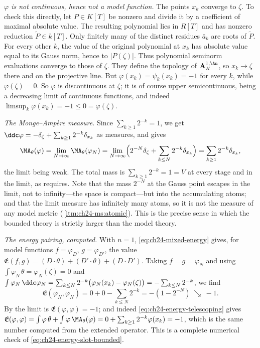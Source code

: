\begin{example}
\emph{$\varphi$ is not continuous, hence not a model function.}  The
points $x_k$ converge to $\zeta$.  To check this directly, let
$P\in K[T]$ be nonzero and divide it by a coefficient of maximal absolute
value.  The resulting polynomial lies in $R[T]$ and has nonzero reduction
$\widetilde P\in k[T]$.  Only finitely many of the distinct residues
$\bar a_k$ are roots of $\widetilde P$.  For every other $k$, the value
of the original polynomial at $x_k$ has absolute value equal to its Gauss
norm, hence to $|P(\zeta)|$.  Thus polynomial seminorm evaluations
converge to those of $\zeta$.  They define the topology of
$\mathbf A^{1,\An}_K$, so $x_k\to\zeta$ there and on the projective
line.
But $\varphi(x_k)=\psi_k(x_k)=-1$ for every $k$, while
$\varphi(\zeta)=0$.  So $\varphi$ is discontinuous at $\zeta$; it is
of course upper semicontinuous, being a decreasing limit of continuous
functions, and indeed $\limsup_k\varphi(x_k)=-1\leq0=\varphi(\zeta)$.

\emph{The Monge--Amp\`ere measure.}  Since
$\sum_{k\geq1}2^{-k}=1$, we get $\ddc\varphi=-\delta_\zeta
+\sum_{k\geq1}2^{-k}\delta_{x_k}$ as measures, and
 gives
\begin{equation}
\label{eq:ch24-branch-measure}
 \MA_\theta(\varphi)
 =\lim_{N\to\infty}\MA_\theta(\varphi_N)
 =\lim_{N\to\infty}\Bigl(2^{-N}\delta_\zeta
   +\sum_{k\leq N}2^{-k}\delta_{x_k}\Bigr)
 =\sum_{k\geq1}2^{-k}\delta_{x_k},
\end{equation}
the limit being weak.  The total mass is
$\sum_{k\geq1}2^{-k}=1=V$ at every stage and in the limit, as
 requires.  Note that the mass $2^{-N}$ at
the Gauss point escapes in the limit, not to infinity---the space is
compact---but into the accumulating atoms; and that the limit measure has
infinitely many atoms, so it is not the measure of any model metric
(\,\cref{itm:ch24-ms:atomic}).  This is the
precise sense in which the bounded theory is strictly larger than the model
theory.

\emph{The energy pairing, computed.}  With $n=1$,
\eqref{eq:ch24-mixed-energy} gives, for model functions $f=\varphi_D$,
$g=\varphi_{D'}$, the value
$\mathfrak E(f,g)=(D\cdot\theta)+(D'\cdot\theta)+(D\cdot D')$.  Taking
$f=g=\varphi_N$ and using
$\int\varphi_N\,\theta=\varphi_N(\zeta)=0$ and
$\int\varphi_N\,\ddc\varphi_N
 =\sum_{k\leq N}2^{-k}\bigl(\varphi_N(x_k)-\varphi_N(\zeta)\bigr)
 =-\sum_{k\leq N}2^{-k}$,
we find
\[
 \mathfrak E(\varphi_N,\varphi_N)=0+0-\sum_{k\leq N}2^{-k}
 =-(1-2^{-N})
 \ \searrow\ -1 .
\]
By  the limit is
$\mathfrak E(\varphi,\varphi)=-1$; and indeed
\eqref{eq:ch24-energy-telescoping} gives
$\mathfrak E(\varphi,\varphi)=\int\varphi\,\theta
 +\int\varphi\,\MA_\theta(\varphi)
 =0+\sum_{k\geq1}2^{-k}\varphi(x_k)=-1$, which is the same number
computed from the extended operator.  This is a complete numerical check of
\eqref{eq:ch24-energy-slot-bounded}.


\end{example}
